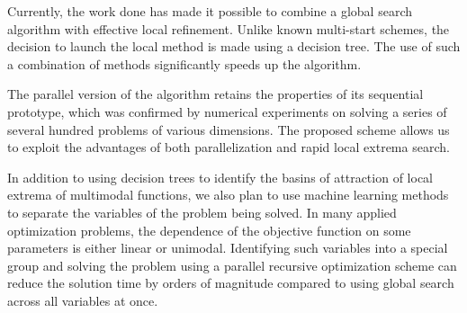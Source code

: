 \documentclass[runningheads]{llncs}
\begin{document}

Currently, the work done has made it possible to combine a global search algorithm with effective local refinement. Unlike known multi-start schemes, the decision to launch the local method is made using a decision tree. The use of such a combination of methods significantly speeds up the algorithm.

The parallel version of the algorithm retains the properties of its sequential prototype, which was confirmed by numerical experiments on solving a series of several hundred problems of various dimensions. The proposed scheme allows us to exploit the advantages of both parallelization and rapid local extrema search.

In addition to using decision trees to identify the basins of attraction of local extrema of multimodal functions, we also plan to use machine learning methods to separate the variables of the problem being solved. In many applied optimization problems, the dependence of the objective function on some parameters is either linear or unimodal. Identifying such variables into a special group and solving the problem using a parallel recursive optimization scheme \cite{Barkalov2020_1} can reduce the solution time by orders of magnitude compared to using global search across all variables at once.
\end{document}
